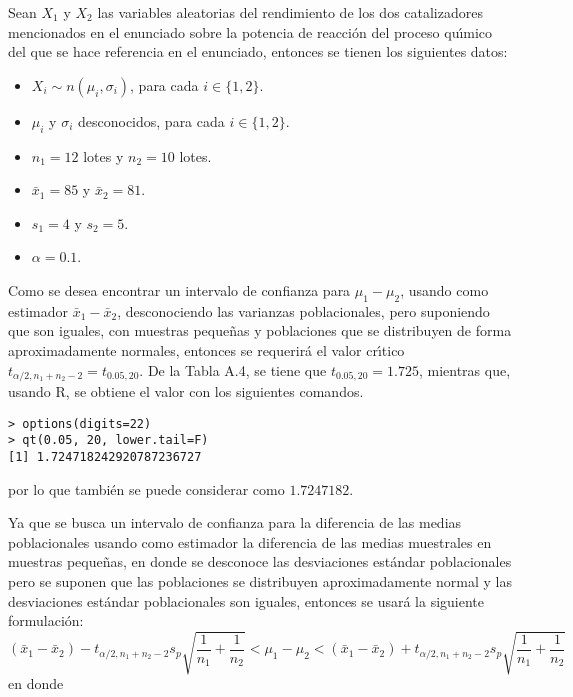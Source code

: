 \begin{solucion}
 Sean $X_1$ y $X_2$ las variables aleatorias del rendimiento de los dos catalizadores mencionados en el enunciado sobre  la potencia de reacci\'on del proceso qu\'{\i}mico del que se hace referencia en el enunciado, entonces se tienen los siguientes datos:
 \begin{itemize}
  \item $X_i \sim n(\mu_i, \sigma_i)$, para cada $i\in\{ 1, 2 \}$.
  \item $\mu_i$ y $\sigma_i$ desconocidos, para cada $i\in\{ 1, 2 \}$.
  \item $n_1 = 12$ lotes y $n_2 = 10$ lotes.
  \item $\bar{x}_1 = 85$ y $\bar{x}_2 = 81$.
  \item $s_1 = 4$ y $s_2 = 5$.
  \item $\alpha = 0.1$.
 \end{itemize}
 Como se desea encontrar un intervalo de confianza para $\mu_1 - \mu_2$, usando como estimador $\bar{x}_1 -\bar{x}_2$, desconociendo las varianzas poblacionales, pero suponiendo que son iguales, con muestras peque\~nas y poblaciones que se distribuyen de forma aproximadamente normales, entonces se requerir\'a el valor cr\'{\i}tico $t_{\alpha/2,n_1+n_2-2} = t_{0.05,20}$. De la Tabla A.4, se tiene que $t_{0.05,20} = 1.725$, mientras que, usando R, se obtiene el valor con los siguientes comandos.
 \begin{verbatim}
> options(digits=22)
> qt(0.05, 20, lower.tail=F)
[1] 1.724718242920787236727
 \end{verbatim}
 \vspace{-0.5cm}
 por lo que tambi\'en se puede considerar como $1.7247182$.
 \par
 Ya que se busca un intervalo de confianza para la diferencia de las medias poblacionales usando como estimador la diferencia de las medias muestrales en muestras peque\~nas, en donde se desconoce las desviaciones est\'andar poblacionales pero se suponen que las poblaciones se distribuyen aproximadamente normal y las desviaciones est\'andar poblacionales son iguales, entonces se usar\'a la siguiente formulaci\'on:
 \begin{equation*}
  \left( \bar{x}_1 - \bar{x}_2 \right) - t_{\alpha/2,n_1+n_2-2} s_p \sqrt{\frac{1}{n_1} + \frac{1}{n_2}} < \mu_1 - \mu_2 < \left( \bar{x}_1 - \bar{x}_2 \right) + t_{\alpha/2,n_1+n_2-2} s_p \sqrt{\frac{1}{n_1} + \frac{1}{n_2}}
 \end{equation*}
 en donde
 \begin{equation*}

\end{equation*}
\end{solucion}
